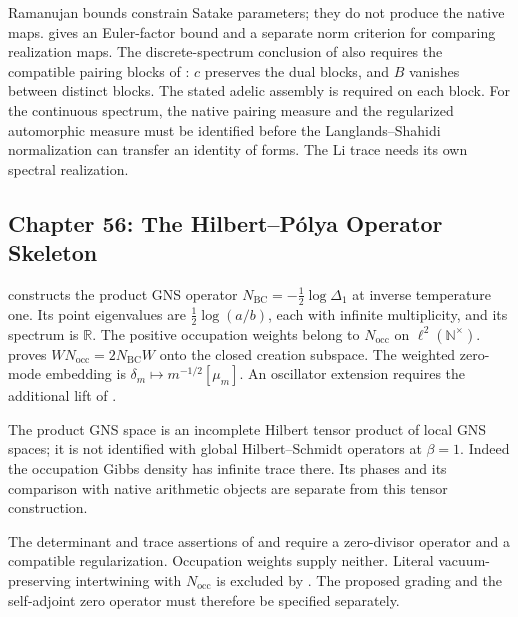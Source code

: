 Ramanujan bounds constrain Satake parameters; they do not produce the
native maps.  gives an Euler-factor
bound and a separate norm criterion for comparing realization maps.
The discrete-spectrum conclusion of
 also requires the
compatible pairing blocks of :
$c$ preserves the dual blocks, and $B$ vanishes between distinct
blocks. The stated adelic assembly is required on each block. For the continuous spectrum, the native
pairing measure and the regularized automorphic measure must be
identified before the Langlands--Shahidi normalization can transfer an
identity of forms. The Li trace needs its own spectral realization.

\subsection{Chapter 56: The Hilbert--P\'{o}lya Operator Skeleton}
\label{v4-arith:w5-synth:ch56}

 constructs the product GNS
operator \(N_{\mathrm{BC}}=-\tfrac12\log\Delta_1\) at inverse
temperature one. Its point eigenvalues are
\(\tfrac12\log(a/b)\), each with infinite multiplicity, and its
spectrum is \(\mathbb R\). The positive occupation weights belong to
\(N_{\mathrm{occ}}\) on \(\ell^2(\mathbb N^\times)\).
 proves
\(WN_{\mathrm{occ}}=2N_{\mathrm{BC}}W\) onto the closed creation
subspace. The weighted zero-mode embedding is
\(\delta_m\mapsto m^{-1/2}[\mu_m]\). An oscillator extension requires
the additional lift of .

The product GNS space is an incomplete Hilbert tensor product of local
GNS spaces; it is not identified with global Hilbert--Schmidt operators
at \(\beta=1\). Indeed the occupation Gibbs density has infinite trace
there. Its phases and its comparison with native arithmetic objects
are separate from this tensor construction.

The determinant and trace assertions of
 and 
require a zero-divisor operator and a compatible regularization.
Occupation weights supply neither. Literal vacuum-preserving
intertwining with \(N_{\mathrm{occ}}\) is excluded by
. The proposed grading and the
self-adjoint zero operator must therefore be specified separately.

